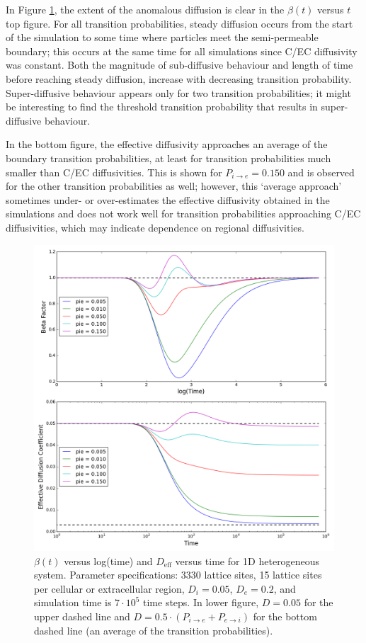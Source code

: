 	 In Figure \ref{fig:pie_beta_deff_1D}, the extent of the anomalous diffusion is clear in the $ \beta (t) $ versus $ t $ top figure. For all transition probabilities, steady diffusion occurs from the start of the simulation to some time where particles meet the semi-permeable boundary; this occurs at the same time for all simulations since C/EC diffusivity was constant. Both the magnitude of sub-diffusive behaviour and length of time before reaching steady diffusion, increase with decreasing transition probability. Super-diffusive behaviour appears only for two transition probabilities; it might be interesting to find the threshold transition probability that results in super-diffusive behaviour.
	 
	 In the bottom figure, the effective diffusivity approaches an average of the boundary transition probabilities, at least for transition probabilities much smaller than C/EC diffusivities. This is shown for $ P_{i \rightarrow e} = 0.150 $ and is observed for the other transition probabilities as well; however, this `average approach' sometimes under- or over-estimates the effective diffusivity obtained in the simulations and does not work well for transition probabilities approaching C/EC diffusivities, which may indicate dependence on regional diffusivities.
	
	\begin{figure}[h!]
		\centering
		\includegraphics[width=1.0\linewidth]{../images/1D/pie_beta_deff_1D}
		\caption{$ \beta (t) $ versus log(time) and $ D_\textrm{eff} $ versus time for 1D heterogeneous system. Parameter specifications: 3330 lattice sites, 15 lattice sites per cellular or extracellular region, $ D_i = 0.05 $, $ D_e = 0.2 $, and simulation time is $ 7\cdot 10^5 $ time steps. In lower figure, $ D = 0.05 $ for the upper dashed line and $ D = 0.5 \cdot (P_{i \rightarrow e} + P_{e \rightarrow i}) $ for the bottom dashed line (an average of the transition probabilities).}
		\label{fig:pie_beta_deff_1D}
	\end{figure}

